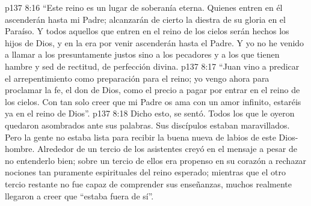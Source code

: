 \vs p137 8:16 “Este reino es un lugar de soberanía eterna. Quienes entren en él ascenderán hasta mi Padre; alcanzarán de cierto la diestra de su gloria en el Paraíso. Y todos aquellos que entren en el reino de los cielos serán hechos los hijos de Dios, y en la era por venir ascenderán hasta el Padre. Y yo no he venido a llamar a los presuntamente justos sino a los pecadores y a los que tienen hambre y sed de rectitud, de perfección divina.
\vs p137 8:17 “Juan vino a predicar el arrepentimiento como preparación para el reino; yo vengo ahora para proclamar la fe, el don de Dios, como el precio a pagar por entrar en el reino de los cielos. Con tan solo creer que mi Padre os ama con un amor infinito, estaréis ya en el reino de Dios”.
\vs p137 8:18 \pc Dicho esto, se sentó. Todos los que le oyeron quedaron asombrados ante sus palabras. Sus discípulos estaban maravillados. Pero la gente no estaba lista para recibir la buena nueva de labios de este Dios\hyp{}hombre. Alrededor de un tercio de los asistentes creyó en el mensaje a pesar de no entenderlo bien; sobre un tercio de ellos era propenso en su corazón a rechazar nociones tan puramente espirituales del reino esperado; mientras que el otro tercio restante no fue capaz de comprender sus enseñanzas, muchos realmente llegaron a creer que “estaba fuera de sí”.
